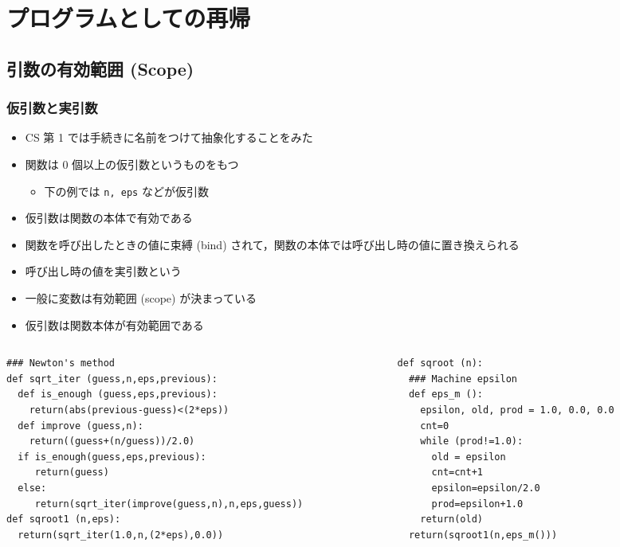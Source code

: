 \section{プログラムとしての再帰}
\subsection{引数の有効範囲 (Scope)}
\begin{frame}
\frametitle{仮引数と実引数}
\scriptsize
  \begin{itemize}
\item CS 第 1 では手続きに名前をつけて抽象化することをみた
\item 関数は 0 個以上の仮引数というものをもつ
    \begin{itemize}
\scriptsize
\item 下の例では {\tt n, eps} などが仮引数
    \end{itemize}
\item 仮引数は関数の本体で有効である
\item 関数を呼び出したときの値に束縛 (bind) されて，関数の本体では呼び出し時の値に置き換えられる
\item 呼び出し時の値を実引数という
\item 一般に変数は有効範囲 (scope) が決まっている
\item 仮引数は関数本体が有効範囲である
  \end{itemize}
\vspace{-3zw}
  \begin{columns}[t]
    \begin{column}{0.5\textwidth}
      \begin{lstlisting}[caption={Newton 法},label=newton-rec]
### Newton's method 
def sqrt_iter (guess,n,eps,previous):
  def is_enough (guess,eps,previous):
    return(abs(previous-guess)<(2*eps))
  def improve (guess,n):
    return((guess+(n/guess))/2.0)
  if is_enough(guess,eps,previous):
     return(guess)
  else:
     return(sqrt_iter(improve(guess,n),n,eps,guess))
def sqroot1 (n,eps):
  return(sqrt_iter(1.0,n,(2*eps),0.0))
      \end{lstlisting}
    \end{column}
    \begin{column}{0.45\textwidth}
      \begin{lstlisting}[caption={Newton 法},firstnumber=13,label=newton-is_enough-rec]
def sqroot (n):
  ### Machine epsilon
  def eps_m ():
    epsilon, old, prod = 1.0, 0.0, 0.0
    cnt=0
    while (prod!=1.0):
      old = epsilon
      cnt=cnt+1
      epsilon=epsilon/2.0
      prod=epsilon+1.0
    return(old)
  return(sqroot1(n,eps_m()))
      \end{lstlisting}
    \end{column}
  \end{columns}
\end{frame}
